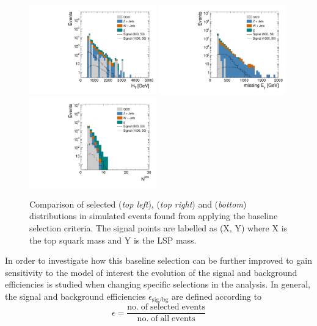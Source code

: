 \begin{figure}[!t]
  \centering
  \begin{minipage}[c]{1.\textwidth}
    \begin{center}
      \includegraphics[width=0.49\textwidth]{figures/Stop_DeltaPhiSelection_HThad.pdf}  
      \includegraphics[width=0.49\textwidth]{figures/Stop_DeltaPhiSelection_MET.pdf} \\
      \includegraphics[width=0.49\textwidth]{figures/Stop_DeltaPhiSelection_N_jets.pdf}
    \end{center}
  \end{minipage}

  \caption{Comparison of selected \HT (\textit{top left}), \met (\textit{top right}) and \NJets (\textit{bottom}) distributions in simulated events found from applying the baseline selection criteria. The signal points are labelled as (X, Y) where X is the top squark mass and Y is the LSP mass.}
  \label{fig:stop_baseline}
\end{figure}
In order to investigate how this baseline selection can be further improved to gain sensitivity to the model of interest the evolution of the signal and background efficiencies is studied when changing specific selections in the analysis. In general, the signal and background efficiencies $\epsilon_\mathrm{sig/bg}$ are defined according to
\begin{equation}
\epsilon = \frac{\mathrm{no. \; of \; selected \; events}}{\mathrm{no. \; of \; all \; events}}
\end{equation} 

